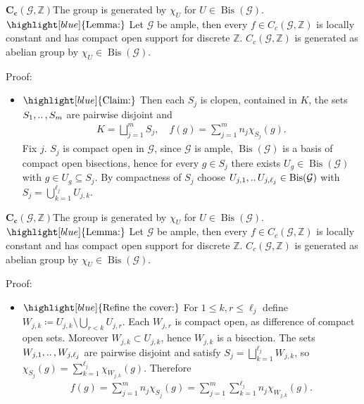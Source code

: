 \documentclass[aspectratio=169]{beamer}
\renewcommand{\ldots}{
  \mathinner{{\ldotp}{\ldotp}}
}
\newcommand{\G}{\mathcal{G}}
\newcommand{\ZZ}{\mathbb{Z}}
\begin{document}
\begin{frame}{$\boldsymbol{C_c(\G,\ZZ)}$}{The group is generated by $\chi_U$ for $U \in \operatorname{Bis}(\G)$.}
    \(\highlight[blue]{\text{Lemma:}}\)  Let $\G$ be ample, then every $f \in C_c(\G,\ZZ)$ is locally constant and has compact open support for discrete $\ZZ$. $C_c(\G,\ZZ)$ is generated as abelian group by $\chi_U \in \operatorname{Bis}(\G)$.
    \vspace{0.2cm}
    
    Proof:
    \begin{itemize}
        \item \(\highlight[blue]{\text{Claim:}}\) Then each $S_j$ is clopen, contained in $K$, the sets $S_1, \ldots, S_m$ are pairwise disjoint and
        \begin{align}
            K = \bigsqcup_{j=1}^{m} S_j, \quad f(g) = \sum_{j=1}^{m} n_j \chi_{S_j}(g).
        \end{align}
        \pause
        Fix $j$. $S_j$ is compact open in $\G$, since $\G$ is ample, $\operatorname{Bis}(\G)$ is a basis of compact open bisections, hence for every $g \in S_j$ there exists $U_g \in \operatorname{Bis}(\G)$ with $g \in U_g \subseteq S_j$. By compactness of $S_j$ choose $U_{j,1}, \ldots U_{j,\ell_j} \in \operatorname{Bis}(\G)$ with $S_j = \bigcup_{k=1}^{\ell_j} U_{j,k}$.
    \end{itemize}
\end{frame}

\begin{frame}{$\boldsymbol{C_c(\G,\ZZ)}$}{The group is generated by $\chi_U$ for $U \in \operatorname{Bis}(\G)$.}
    \(\highlight[blue]{\text{Lemma:}}\)  Let $\G$ be ample, then every $f \in C_c(\G,\ZZ)$ is locally constant and has compact open support for discrete $\ZZ$. $C_c(\G,\ZZ)$ is generated as abelian group by $\chi_U \in \operatorname{Bis}(\G)$.
    \vspace{0.2cm}
    
    Proof:
    \begin{itemize}
        \item \(\highlight[blue]{\text{Refine the cover:}}\) For $1 \leq k,r \leq \ell_j$ define $W_{j,k} \coloneqq U_{j,k} \setminus\bigcup_{r<k} U_{j,r}$. Each $W_{j,r}$ is compact open, as difference of compact open sets. Moreover $W_{j,k} \subset U_{j,k}$, hence $W_{j,k}$ is a bisection. The sets $W_{j,1}, \ldots, W_{j,\ell_j}$ are pairwise disjoint and satisfy $S_j = \bigsqcup_{k=1}^{\ell_j} W_{j,k}$, so $\chi_{S_j}(g) = \sum_{k=1}^{\ell_j} \chi_{W_{j,k}}(g)$. Therefore
        \begin{align}
            f(g) = \sum_{j=1}^{m}n_j \chi_{S_j}(g) = \sum_{j=1}^{m}\sum_{k=1}^{\ell_j} n_j \chi_{W_{j,k}}(g).
        \end{align}
    \end{itemize}
\end{frame}
\end{document}
